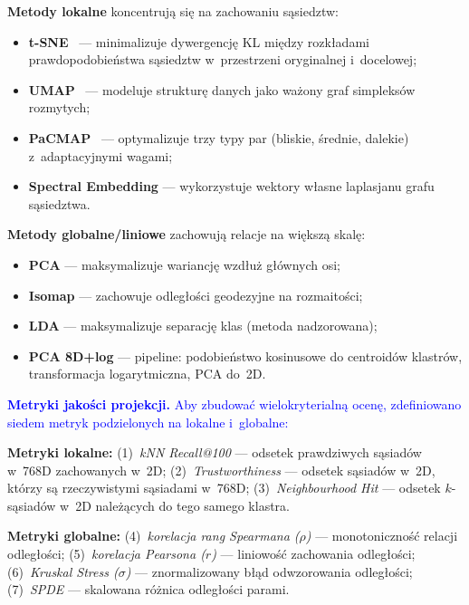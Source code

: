 \documentclass[a4paper,11pt,twocolumn]{article}
\newcommand{\hl}[1]{\textcolor{blue}{#1}}
\begin{document}
\textbf{Metody lokalne} koncentrują się na zachowaniu sąsiedztw:
\begin{itemize}
  \item \textbf{t-SNE}~\cite{maaten2008} --- minimalizuje dywergencję KL
        między rozkładami prawdopodobieństwa sąsiedztw w~przestrzeni
        oryginalnej i~docelowej;
  \item \textbf{UMAP}~\cite{mcinnes2018} --- modeluje strukturę danych
        jako ważony graf simpleksów rozmytych;
  \item \textbf{PaCMAP}~\cite{wang2021} --- optymalizuje trzy typy par
        (bliskie, średnie, dalekie) z~adaptacyjnymi wagami;
  \item \textbf{Spectral Embedding} --- wykorzystuje wektory własne
        laplasjanu grafu sąsiedztwa.
\end{itemize}

\textbf{Metody globalne/liniowe} zachowują relacje na większą skalę:
\begin{itemize}
  \item \textbf{PCA} --- maksymalizuje wariancję wzdłuż głównych osi;
  \item \textbf{Isomap} \cite{tenenbaum2000} --- zachowuje odległości
        geodezyjne na rozmaitości;
  \item \textbf{LDA} --- maksymalizuje separację klas (metoda nadzorowana);
  \item \textbf{PCA 8D+log} --- pipeline: podobieństwo kosinusowe do
        centroidów klastrów, transformacja logarytmiczna, PCA do~2D.
\end{itemize}

\hl{\textbf{Metryki jakości projekcji.}}
\hl{Aby zbudować wielokryterialną ocenę, zdefiniowano siedem metryk
podzielonych na lokalne i~globalne:}

\textbf{Metryki lokalne:}
(1)~\emph{kNN Recall@100} --- odsetek prawdziwych sąsiadów w~768D
zachowanych w~2D;
(2)~\emph{Trustworthiness} --- odsetek sąsiadów w~2D, którzy są
rzeczywistymi sąsiadami w~768D;
(3)~\emph{Neighbourhood Hit} --- odsetek $k$-sąsiadów w~2D
należących do tego samego klastra.

\textbf{Metryki globalne:}
(4)~\emph{korelacja rang Spearmana ($\rho$)} --- monotoniczność relacji
odległości;
(5)~\emph{korelacja Pearsona ($r$)} --- liniowość zachowania odległości;
(6)~\emph{Kruskal Stress ($\sigma$)} --- znormalizowany błąd
odwzorowania odległości;
(7)~\emph{SPDE} --- skalowana różnica odległości parami.
\end{document}
